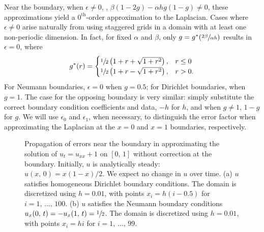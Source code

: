 Near the boundary, when $\epsilon\neq0$, , $\beta(1-2g)-\alpha hg(1-g)\neq0$,
these approximations yield a $0^\text{th}$-order approximation to the Laplacian. Cases
where $\epsilon \neq 0$ arise naturally from using staggered grids in a domain with at
least one non-periodic dimension. In fact, for fixed $\alpha$ and $\beta$, only
$g=g^\ast(\sfrac{2\beta}{\alpha h})$ results in $\epsilon = 0$, where
\begin{equation*}
    g^\ast(r) = \begin{cases}
        \sfrac12\left(1+r+\sqrt{1+r^2}\right), & r \le 0 \\
        \sfrac12\left(1+r-\sqrt{1+r^2}\right), & r > 0.
    \end{cases}
\end{equation*}
For Neumann boundaries, $\epsilon = 0$ when $g = 0.5$; for Dirichlet boundaries, when
$g = 1$. The case for the opposing boundary is very similar: simply substitute the
correct boundary condition coefficients and data, $-h$ for $h$, and when $g\neq1$, $1-g$
for $g$. We will use $\epsilon_0$ and $\epsilon_1$, when necessary, to distinguish the
error factor when approximating the Laplacian at the $x=0$ and $x=1$ boundaries,
respectively.

\begin{figure}[t]
\centering
{}
\hspace{0.5cm}
\caption[Propagation of boundary errors without correction]{%
    Propagation of errors near the boundary in approximating the solution of
    $u_t = u_{xx} + 1$ on $[0,\,1]$ without correction at the boundary. Initially, $u$ is
    analytically steady: $u(x,\,0) = x(1-x)/2$. We expect no change in $u$ over time.
    (a) $u$ satisfies homogeneous Dirichlet boundary conditions. The domain is
    discretized using $h=0.01$, with points $x_i=h(i-0.5)$ for $i=1,\,\ldots,\,100$.
    (b) $u$ satisfies the Neumann boundary conditions $u_x(0,\,t)=-u_x(1,\,t)=\sfrac12$.
    The domain is discretized using $h=0.01$, with points $x_i = hi$ for
    $i=1,\,\ldots,\,99$.
}\label{fig:error}
\end{figure}

